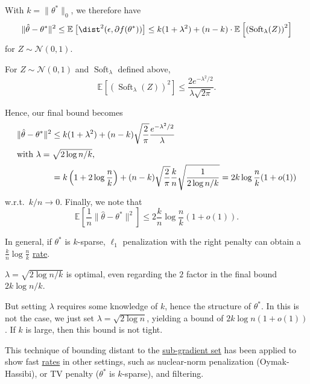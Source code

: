 With \(k = \lVert \theta ^{\ast} \rVert _0\), we therefore have
\[
	\lVert \hat{\theta} - \theta ^{\ast}  \rVert ^2
	\leq \mathbb{E}_{}\left[\dist^2(\epsilon , \partial f(\theta ^{\ast} )) \right]
	\leq k (1 + \lambda ^2) + (n - k) \cdot \mathbb{E}_{}\left[\left( \operatorname{Soft}_\lambda (Z)  \right) ^2 \right]
\]
for \(Z \sim \mathcal{N} (0, 1)\).

\begin{claim}
	For \(Z \sim \mathcal{N} (0, 1)\) and \(\operatorname{Soft}_\lambda \) defined above,
	\[
		\mathbb{E}_{}\left[ \left( \operatorname{Soft}_\lambda (Z) \right) ^2 \right]
		\leq \frac{2 e^{-\lambda ^2 / 2}}{ \lambda \sqrt{2\pi } }.
	\]
\end{claim}
\begin{explanation}

\end{explanation}

Hence, our final bound becomes
\begin{align*}
	\lVert \hat{\theta} - \theta ^{\ast} \rVert ^2
	 & \leq k(1 + \lambda ^2) + (n-k) \sqrt{\frac{2}{\pi }} \frac{e^{-\lambda ^2 / 2}}{\lambda }                         \\
	\shortintertext{with \(\lambda = \sqrt{2 \log n / k} \),}
	 & = k \left( 1 + 2 \log \frac{n}{k} \right) + (n-k) \sqrt{\frac{2}{\pi }} \frac{k}{n} \sqrt{\frac{1}{2 \log n / k}}
	= 2 k \log \frac{n}{k} (1 + o(1))
\end{align*}
w.r.t.\ \(k / n \to 0\). Finally, we note that
\[
	\mathbb{E}_{}\left[\frac{1}{n} \lVert \hat{\theta} - \theta ^{\ast} \rVert ^2 \right]
	\leq 2 \frac{k}{n} \log \frac{n}{k} (1 + o(1)).
\]

\begin{note}
	In general, if \(\theta ^{\ast} \) is \(k\)-sparse, \(\ell _1\) penalization with the right penalty can obtain a \(\frac{k}{n} \log \frac{n}{k}\) \hyperref[def:rate-of-convergence]{rate}.
\end{note}

\begin{remark}
	\(\lambda = \sqrt{2 \log n / k} \) is optimal, even regarding the \(2\) factor in the final bound \(2k \log n / k\).
\end{remark}

But setting \(\lambda \) requires some knowledge of \(k\), hence the structure of \(\theta ^{\ast} \). In this is not the case, we just set \(\lambda = \sqrt{2 \log n} \), yielding a bound of \(2 k \log n (1 + o(1))\). If \(k\) is large, then this bound is not tight.

\begin{note}
	This technique of bounding distant to the \hyperref[def:sub-gradient]{sub-gradient set} has been applied to show fast \hyperref[def:rate-of-convergence]{rates} in other settings, such as nuclear-norm penalization (Oymak-Hassibi), or TV penalty (\(\theta ^{\ast} \) is \(k\)-sparse), and filtering.
\end{note}